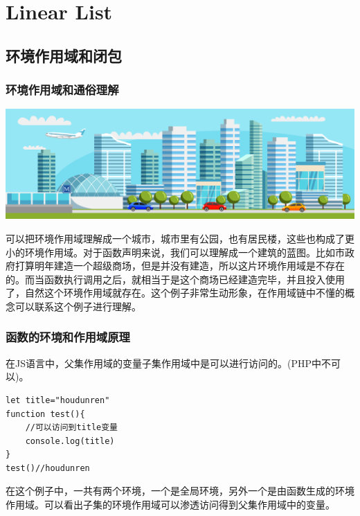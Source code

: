 \documentclass[
	11pt,
	fleqn,
	a4paper,
]{LegrandOrangeBook}
\begin{document}
\part{Linear List}


\chapterspaceabove{6.75cm} %
\chapterspacebelow{7.25cm} %
\chapter{环境作用域和闭包}
\section{环境作用域和通俗理解}
\begin{center}
    \includegraphics[scale=0.2]{Images/subway_02.jpg}
\end{center}
可以把环境作用域理解成一个城市，城市里有公园，也有居民楼，这些也构成了更小的环境作用域。对于函数声明来说，我们可以理解成一个建筑的蓝图。比如市政府打算明年建造一个超级商场，但是并没有建造，所以这片环境作用域是不存在的。而当函数执行调用之后，就相当于是这个商场已经建造完毕，并且投入使用了，自然这个环境作用域就存在。这个例子非常生动形象，在作用域链中不懂的概念可以联系这个例子进行理解。
\section{函数的环境和作用域原理}
在JS语言中，父集作用域的变量子集作用域中是可以进行访问的。(PHP中不可以)。
\begin{verbatim}
let title="houdunren"
function test(){
    //可以访问到title变量
    console.log(title)
}
test()//houdunren
\end{verbatim}
\begin{remark}
    在这个例子中，一共有两个环境，一个是全局环境，另外一个是由函数生成的环境作用域。可以看出子集的环境作用域可以渗透访问得到父集作用域中的变量。
\end{remark}
\end{document}
